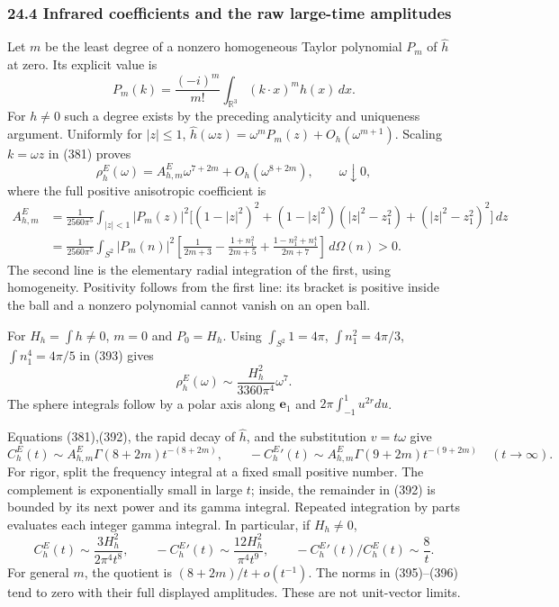 \documentclass[
  11pt,
]{article}
\begin{document}
\subsubsection{24.4 Infrared coefficients and the raw large-time
amplitudes}\label{infrared-coefficients-and-the-raw-large-time-amplitudes}

Let \(m\) be the least degree of a nonzero homogeneous Taylor polynomial
\(P_m\) of \(\widehat h\) at zero. Its explicit value is \[
 P_m(k)=\frac{(-i)^m}{m!}\int_{\mathbb R^3}(k\cdot x)^m h(x)\,dx.
 \tag{391}
\] For \(h\ne0\) such a degree exists by the preceding analyticity and
uniqueness argument. Uniformly for \(|z|\le1\),
\(\widehat h(\omega z)=\omega^mP_m(z)+O_h(\omega^{m+1})\). Scaling
\(k=\omega z\) in (381) proves \[
 \rho^E_h(\omega)=A^E_{h,m}\omega^{7+2m}
                   +O_h(\omega^{8+2m}),\qquad\omega\downarrow0,
 \tag{392}
\] where the full positive anisotropic coefficient is \[
 \begin{split}
 A^E_{h,m}
 &=\frac1{2560\pi^5}
 \int_{|z|<1}|P_m(z)|^2
 \bigl[(1-|z|^2)^2+
       (1-|z|^2)(|z|^2-z_1^2)+(|z|^2-z_1^2)^2\bigr]\,dz\\
 &=\frac1{2560\pi^5}\int_{S^2}|P_m(n)|^2
 \left[
 \frac1{2m+3}-\frac{1+n_1^2}{2m+5}
             +\frac{1-n_1^2+n_1^4}{2m+7}
 \right]\,d\Omega(n)>0 .
 \end{split}
 \tag{393}
\] The second line is the elementary radial integration of the first,
using homogeneity. Positivity follows from the first line: its bracket
is positive inside the ball and a nonzero polynomial cannot vanish on an
open ball.

For \(H_h=\int h\ne0\), \(m=0\) and \(P_0=H_h\). Using
\(\int_{S^2}1=4\pi\), \(\int n_1^2=4\pi/3\), \(\int n_1^4=4\pi/5\) in
(393) gives \[
 \boxed{\rho^E_h(\omega)\sim
       \frac{H_h^2}{3360\pi^4}\omega^7.}
 \tag{394}
\] The sphere integrals follow by a polar axis along \(\mathbf e_1\) and
\(2\pi\int_{-1}^1u^{2r}du\).

Equations (381),(392), the rapid decay of \(\widehat h\), and the
substitution \(v=t\omega\) give \[
 C^E_h(t)\sim
 A^E_{h,m}\Gamma(8+2m)t^{-(8+2m)},\qquad
 -{C^E_h}'(t)\sim
 A^E_{h,m}\Gamma(9+2m)t^{-(9+2m)}
 \quad(t\to\infty).
 \tag{395}
\] For rigor, split the frequency integral at a fixed small positive
number. The complement is exponentially small in large \(t\); inside,
the remainder in (392) is bounded by its next power and its gamma
integral. Repeated integration by parts evaluates each integer gamma
integral. In particular, if \(H_h\ne0\), \[
 \boxed{
 C^E_h(t)\sim\frac{3H_h^2}{2\pi^4t^8},\qquad
 -{C^E_h}'(t)\sim\frac{12H_h^2}{\pi^4t^9},\qquad
 -{C^E_h}'(t)/C^E_h(t)\sim\frac8t.
 }
 \tag{396}
\] For general \(m\), the quotient is \((8+2m)/t+o(t^{-1})\). The norms
in (395)--(396) tend to zero with their full displayed amplitudes. These
are not unit-vector limits.
\end{document}
